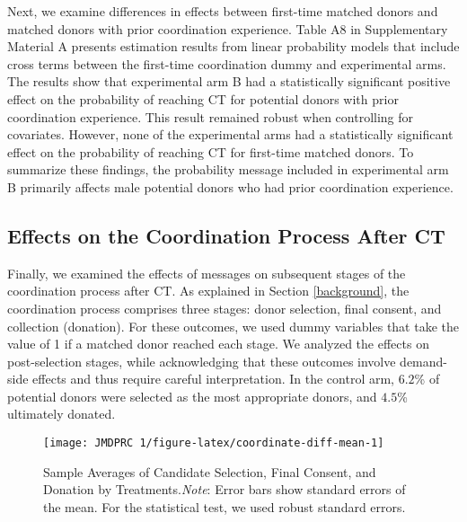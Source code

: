 \documentclass[12pt, a4paper]{article}
\begin{document}
Next, we examine differences in effects between first-time matched donors and matched donors with prior coordination experience. Table A8 in Supplementary Material A presents estimation results from linear probability models that include cross terms between the first-time coordination dummy and experimental arms. The results show that experimental arm B had a statistically significant positive effect on the probability of reaching CT for potential donors with prior coordination experience. This result remained robust when controlling for covariates. However, none of the experimental arms had a statistically significant effect on the probability of reaching CT for first-time matched donors. To summarize these findings, the probability message included in experimental arm B primarily affects male potential donors who had prior coordination experience.

\hypertarget{process}{%
\subsection{Effects on the Coordination Process After CT}\label{process}}

Finally, we examined the effects of messages on subsequent stages of the coordination process after CT. As explained in Section \ref{background}, the coordination process comprises three stages: donor selection, final consent, and collection (donation). For these outcomes, we used dummy variables that take the value of 1 if a matched donor reached each stage. We analyzed the effects on post-selection stages, while acknowledging that these outcomes involve demand-side effects and thus require careful interpretation. In the control arm, \(6.2\)\% of potential donors were selected as the most appropriate donors, and \(4.5\)\% ultimately donated.

\begin{figure}[t]
\texttt{[image: JMDPRC~1/figure-latex/coordinate-diff-mean-1]} \caption{Sample Averages of Candidate Selection, Final Consent, and Donation by Treatments.\newline \emph{Note}: Error bars show standard errors of the mean. For the statistical test, we used robust standard errors.}\label{fig:coordinate-diff-mean}
\end{figure}
\end{document}
